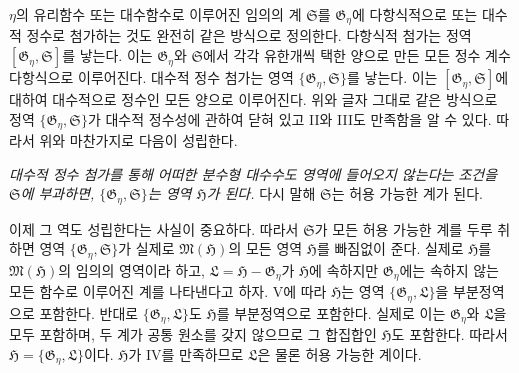 $\eta$의 유리함수 또는 대수함수로 이루어진 임의의 계 $\mathfrak S$를 $\mathfrak G_\eta$에 다항식적으로 또는 대수적 정수로 첨가하는 것도 완전히 같은 방식으로 정의한다. 다항식적 첨가는 정역 $[\mathfrak G_\eta,\mathfrak S]$를 낳는다. 이는 $\mathfrak G_\eta$와 $\mathfrak S$에서 각각 유한개씩 택한 양으로 만든 모든 정수 계수 다항식으로 이루어진다. 대수적 정수 첨가는 영역 $\{\mathfrak G_\eta,\mathfrak S\}$를 낳는다. 이는 $[\mathfrak G_\eta,\mathfrak S]$에 대하여 대수적으로 정수인 모든 양으로 이루어진다. 위와 글자 그대로 같은 방식으로 정역 $\{\mathfrak G_\eta,\mathfrak S\}$가 대수적 정수성에 관하여 닫혀 있고 II와 III도 만족함을 알 수 있다. 따라서 위와 마찬가지로 다음이 성립한다.

\emph{대수적 정수 첨가를 통해 어떠한 분수형 대수수도 영역에 들어오지 않는다는 조건을 $\mathfrak S$에 부과하면, $\{\mathfrak G_\eta,\mathfrak S\}$는 영역 $\mathfrak H$가 된다.} 다시 말해 $\mathfrak S$는 허용 가능한 계가 된다.

이제 그 역도 성립한다는 사실이 중요하다. 따라서 $\mathfrak S$가 모든 허용 가능한 계를 두루 취하면 영역 $\{\mathfrak G_\eta,\mathfrak S\}$가 실제로 $\mathfrak M(\mathfrak H)$의 모든 영역 $\mathfrak H$를 빠짐없이 준다. 실제로 $\mathfrak H$를 $\mathfrak M(\mathfrak H)$의 임의의 영역이라 하고, $\mathfrak L=\mathfrak H-\mathfrak G_\eta$가 $\mathfrak H$에 속하지만 $\mathfrak G_\eta$에는 속하지 않는 모든 함수로 이루어진 계를 나타낸다고 하자. V에 따라 $\mathfrak H$는 영역 $\{\mathfrak G_\eta,\mathfrak L\}$을 부분정역으로 포함한다. 반대로 $\{\mathfrak G_\eta,\mathfrak L\}$도 $\mathfrak H$를 부분정역으로 포함한다. 실제로 이는 $\mathfrak G_\eta$와 $\mathfrak L$을 모두 포함하며, 두 계가 공통 원소를 갖지 않으므로 그 합집합인 $\mathfrak H$도 포함한다. 따라서
$\mathfrak H=\{\mathfrak G_\eta,\mathfrak L\}$이다. $\mathfrak H$가 IV를 만족하므로 $\mathfrak L$은 물론 허용 가능한 계이다.

